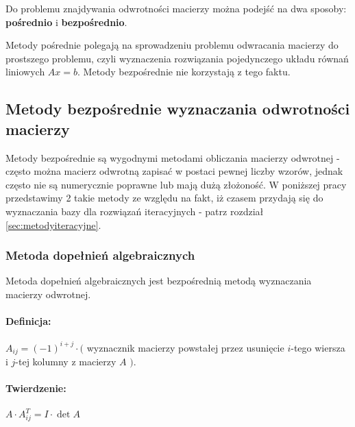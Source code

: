 \documentclass{article}
\begin{document}
Do problemu znajdywania odwrotności macierzy można podejść na dwa sposoby: \textbf{pośrednio} i \textbf{bezpośrednio}.

Metody pośrednie polegają na sprowadzeniu problemu odwracania macierzy do prostszego problemu, czyli wyznaczenia rozwiązania pojedynczego układu równań liniowych $Ax = b$. Metody bezpośrednie nie korzystają z tego faktu.

\subsection{Metody bezpośrednie wyznaczania odwrotności macierzy}

Metody bezpośrednie są wygodnymi metodami obliczania macierzy odwrotnej - często można macierz odwrotną zapisać w postaci pewnej liczby wzorów, jednak często nie są numerycznie poprawne lub mają dużą złożoność. W poniższej pracy przedstawimy 2 takie metody ze względu na fakt, iż czasem przydają się do wyznaczania bazy dla rozwiązań iteracyjnych - patrz rozdział \ref{sec:metodyiteracyjne}.

\subsubsection{Metoda dopełnień algebraicznych \label{sec:dopelnienia}}

Metoda dopełnień algebraicznych jest bezpośrednią  metodą wyznaczania macierzy odwrotnej.

\paragraph{Definicja:} $A_{ij} = (-1)^{i+j} \cdot ($ wyznacznik  macierzy powstałej przez usunięcie $i$-tego wiersza i $j$-tej kolumny z macierzy $A$ $)$.

\paragraph{Twierdzenie:} $A \cdot A_{ij}^T = I \cdot \det A$
\end{document}
